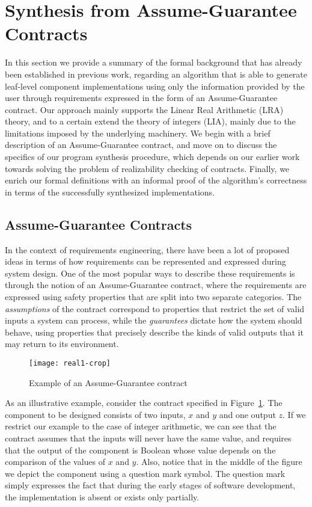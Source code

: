 \section{Synthesis from Assume-Guarantee Contracts}
\label{sec:synthesis}

In this section we provide a summary of the formal background
that has already been established in previous work, regarding an algorithm that
is able to generate leaf-level component implementations using only the
information provided by the user through requirements expressed in the form of an
Assume-Guarantee contract. Our approach mainly supports the Linear Real
Arithmetic (LRA) theory, and to a certain extend the theory of integers (LIA),
mainly due to the limitations imposed by the underlying machinery. We
begin with a brief description of an Assume-Guarantee contract, and
move on to discuss the specifics of our program synthesis procedure,
which depends on our earlier work towards solving the problem of realizability
checking of contracts.
Finally, we enrich our formal definitions with an informal proof of the
algorithm's correctness in terms of the successfully synthesized
implementations.

\subsection{Assume-Guarantee Contracts}

In the context of requirements engineering, there have been a lot of proposed
ideas in terms of how requirements can be represented and expressed during
system design. 
One of the most popular ways to describe these requirements is through
the notion of an Assume-Guarantee contract, where the requirements are expressed
using safety properties that are split into two separate categories. The
\emph{assumptions} of the contract correspond to properties that restrict the
set of valid inputs a system can process, while the \emph{guarantees} dictate
how the system should behave, using properties that precisely describe
the kinds of valid outputs that it may return to its environment.

\begin{figure}[H]
	\centering
	\texttt{[image: real1-crop]}    	
	\caption{Example of an Assume-Guarantee contract}
	\label{fg:example}
\end{figure}

As an illustrative example, consider the contract specified in
Figure~\ref{fg:example}. The component to be designed consists of two inputs,
$x$ and $y$ and one output $z$. If we restrict our example to the case of integer arithmetic,
we can see that the contract assumes that the inputs will never have the same value,
and requires that the output of the component is Boolean 
whose value depends on the comparison of the values of $x$ and $y$.
Also, notice that in the middle of the figure we depict the component using a
question mark symbol. The question mark simply expresses the fact that during
the early stages of software development, the implementation is absent or exists only partially.

